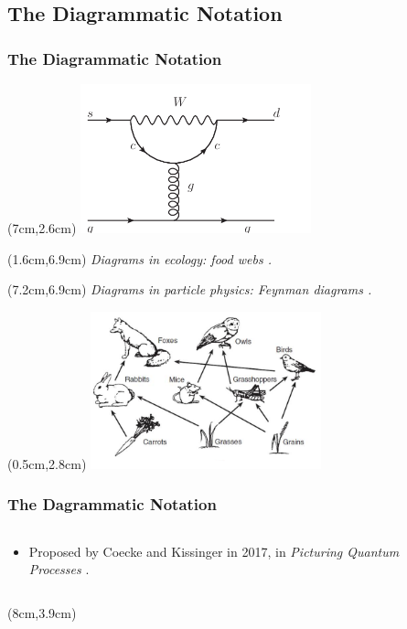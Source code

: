 \documentclass[]{beamer}
\begin{document}
\subsection{The Diagrammatic Notation}

\begin{frame}
	\frametitle{The Diagrammatic Notation}
		\begin{textblock*}{12cm}(7cm,2.6cm)
		\includegraphics[width=0.5\textwidth]{PenguinDiagram.png}
	\end{textblock*}
	\begin{textblock*}{6cm}(1.6cm,6.9cm)
	\tiny	\textit{Diagrams in ecology: food webs \cite{Glaser}.}
	\end{textblock*}
	\begin{textblock*}{6cm}(7.2cm,6.9cm)
		\tiny	\textit{Diagrams in particle physics: Feynman diagrams \cite{Vos}.}
	\end{textblock*}
		\begin{textblock*}{12cm}(0.5cm,2.8cm)
		\includegraphics[width=0.5\textwidth]{FoodWeb.png}
	\end{textblock*}
\end{frame}

\begin{frame}
	\frametitle{The Dagrammatic Notation}
	\begin{columns}
		\begin{column}{0.5\textwidth}
			\begin{itemize}
			\item Proposed by Coecke and Kissinger in 2017, in \textit{Picturing Quantum Processes} \cite{Coecke2017}. 
			\end{itemize}
		\end{column}
		\begin{column}{0.5\textwidth}
			
		\end{column}
	\end{columns}
	 \begin{textblock*}{6cm}(8cm,3.9cm)
	 \end{textblock*}
\end{frame}
\end{document}
